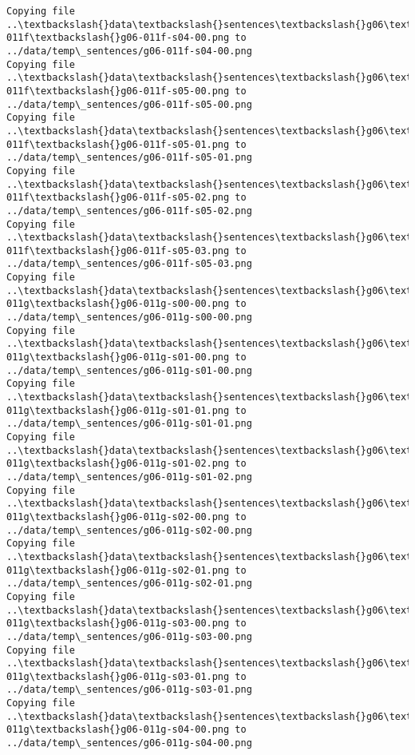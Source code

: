 \documentclass[11pt]{article}
\begin{document}
\begin{Verbatim}[commandchars=\\\{\}]
Copying file ..\textbackslash{}data\textbackslash{}sentences\textbackslash{}g06\textbackslash{}g06-011f\textbackslash{}g06-011f-s04-00.png to
../data/temp\_sentences/g06-011f-s04-00.png
Copying file ..\textbackslash{}data\textbackslash{}sentences\textbackslash{}g06\textbackslash{}g06-011f\textbackslash{}g06-011f-s05-00.png to
../data/temp\_sentences/g06-011f-s05-00.png
Copying file ..\textbackslash{}data\textbackslash{}sentences\textbackslash{}g06\textbackslash{}g06-011f\textbackslash{}g06-011f-s05-01.png to
../data/temp\_sentences/g06-011f-s05-01.png
Copying file ..\textbackslash{}data\textbackslash{}sentences\textbackslash{}g06\textbackslash{}g06-011f\textbackslash{}g06-011f-s05-02.png to
../data/temp\_sentences/g06-011f-s05-02.png
Copying file ..\textbackslash{}data\textbackslash{}sentences\textbackslash{}g06\textbackslash{}g06-011f\textbackslash{}g06-011f-s05-03.png to
../data/temp\_sentences/g06-011f-s05-03.png
Copying file ..\textbackslash{}data\textbackslash{}sentences\textbackslash{}g06\textbackslash{}g06-011g\textbackslash{}g06-011g-s00-00.png to
../data/temp\_sentences/g06-011g-s00-00.png
Copying file ..\textbackslash{}data\textbackslash{}sentences\textbackslash{}g06\textbackslash{}g06-011g\textbackslash{}g06-011g-s01-00.png to
../data/temp\_sentences/g06-011g-s01-00.png
Copying file ..\textbackslash{}data\textbackslash{}sentences\textbackslash{}g06\textbackslash{}g06-011g\textbackslash{}g06-011g-s01-01.png to
../data/temp\_sentences/g06-011g-s01-01.png
Copying file ..\textbackslash{}data\textbackslash{}sentences\textbackslash{}g06\textbackslash{}g06-011g\textbackslash{}g06-011g-s01-02.png to
../data/temp\_sentences/g06-011g-s01-02.png
Copying file ..\textbackslash{}data\textbackslash{}sentences\textbackslash{}g06\textbackslash{}g06-011g\textbackslash{}g06-011g-s02-00.png to
../data/temp\_sentences/g06-011g-s02-00.png
Copying file ..\textbackslash{}data\textbackslash{}sentences\textbackslash{}g06\textbackslash{}g06-011g\textbackslash{}g06-011g-s02-01.png to
../data/temp\_sentences/g06-011g-s02-01.png
Copying file ..\textbackslash{}data\textbackslash{}sentences\textbackslash{}g06\textbackslash{}g06-011g\textbackslash{}g06-011g-s03-00.png to
../data/temp\_sentences/g06-011g-s03-00.png
Copying file ..\textbackslash{}data\textbackslash{}sentences\textbackslash{}g06\textbackslash{}g06-011g\textbackslash{}g06-011g-s03-01.png to
../data/temp\_sentences/g06-011g-s03-01.png
Copying file ..\textbackslash{}data\textbackslash{}sentences\textbackslash{}g06\textbackslash{}g06-011g\textbackslash{}g06-011g-s04-00.png to
../data/temp\_sentences/g06-011g-s04-00.png

\end{Verbatim}
\end{document}
